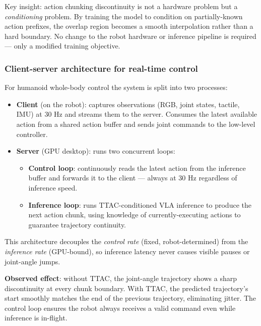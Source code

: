 \begin{paperbox}[title={Training-Time Action Conditioning (TTAC)}]
Key insight: action chunking discontinuity is not a hardware problem but a \emph{conditioning} problem. By training the model to condition on partially-known action prefixes, the overlap region becomes a smooth interpolation rather than a hard boundary. No change to the robot hardware or inference pipeline is required — only a modified training objective.
\end{paperbox}

\subsubsection{Client-server architecture for real-time control}

For humanoid whole-body control the system is split into two processes:

\begin{itemize}
  \item \textbf{Client} (on the robot): captures observations (RGB, joint states, tactile, IMU) at 30 Hz and streams them to the server. Consumes the latest available action from a shared action buffer and sends joint commands to the low-level controller.
  \item \textbf{Server} (GPU desktop): runs two concurrent loops:
    \begin{itemize}
      \item \textbf{Control loop}: continuously reads the latest action from the inference buffer and forwards it to the client — always at 30 Hz regardless of inference speed.
      \item \textbf{Inference loop}: runs TTAC-conditioned VLA inference to produce the next action chunk, using knowledge of currently-executing actions to guarantee trajectory continuity.
    \end{itemize}
\end{itemize}

This architecture decouples the \emph{control rate} (fixed, robot-determined) from the \emph{inference rate} (GPU-bound), so inference latency never causes visible pauses or joint-angle jumps.

\begin{notebox}
\textbf{Observed effect}: without TTAC, the joint-angle trajectory shows a sharp discontinuity at every chunk boundary. With TTAC, the predicted trajectory's start smoothly matches the end of the previous trajectory, eliminating jitter. The control loop ensures the robot always receives a valid command even while inference is in-flight.
\end{notebox}
